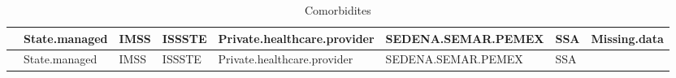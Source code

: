 \documentclass[10pt,letterpaper]{article}
\begin{document}
\begin{longtable}[]{@{}lllllllr@{}}
\caption{Comorbidites}\tabularnewline
\toprule
\begin{minipage}[b]{0.20\columnwidth}\raggedright
\strut
\end{minipage} & \begin{minipage}[b]{0.09\columnwidth}\raggedright
State.managed\strut
\end{minipage} & \begin{minipage}[b]{0.08\columnwidth}\raggedright
IMSS\strut
\end{minipage} & \begin{minipage}[b]{0.08\columnwidth}\raggedright
ISSSTE\strut
\end{minipage} & \begin{minipage}[b]{0.11\columnwidth}\raggedright
Private.healthcare.provider\strut
\end{minipage} & \begin{minipage}[b]{0.09\columnwidth}\raggedright
SEDENA.SEMAR.PEMEX\strut
\end{minipage} & \begin{minipage}[b]{0.08\columnwidth}\raggedright
SSA\strut
\end{minipage} & \begin{minipage}[b]{0.05\columnwidth}\raggedleft
Missing.data\strut
\end{minipage}\tabularnewline
\midrule
\endfirsthead
\toprule
\begin{minipage}[b]{0.20\columnwidth}\raggedright
\strut
\end{minipage} & \begin{minipage}[b]{0.09\columnwidth}\raggedright
State.managed\strut
\end{minipage} & \begin{minipage}[b]{0.08\columnwidth}\raggedright
IMSS\strut
\end{minipage} & \begin{minipage}[b]{0.08\columnwidth}\raggedright
ISSSTE\strut
\end{minipage} & \begin{minipage}[b]{0.11\columnwidth}\raggedright
Private.healthcare.provider\strut
\end{minipage} & \begin{minipage}[b]{0.09\columnwidth}\raggedright
SEDENA.SEMAR.PEMEX\strut
\end{minipage} & \begin{minipage}[b]{0.08\columnwidth}\raggedright
SSA\strut
\end{minipage} & \begin{minipage}[b]{0.05\columnwidth}\raggedleft

\end{minipage}
\end{longtable}
\end{document}
